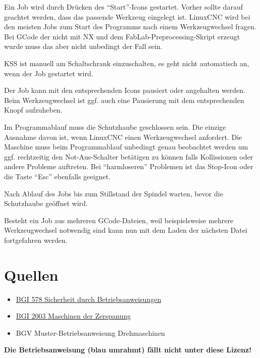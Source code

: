 \documentclass{\basedir/fablab-document}
\begin{document}
Ein Job wird durch Drücken des \enquote{Start}-Icons gestartet. Vorher sollte darauf geachtet werden,
dass das passende Werkzeug eingelegt ist. LinuxCNC wird bei den meisten Jobs zum Start des Programms nach einem Werkzeugwechsel fragen. Bei GCode der nicht mit NX und dem FabLab-Preprocessing-Skript erzeugt wurde muss das aber nicht unbedingt der Fall sein.

KSS ist manuell am Schaltschrank einzuschalten, es geht nicht automatisch an, wenn der Job gestartet wird.

Der Job kann mit den entsprechenden Icons pausiert oder angehalten werden. Beim Werkzeugwechsel ist ggf. auch eine Pausierung mit dem entsprechenden Knopf aufzuheben.

Im Programmablauf muss die Schutzhaube geschlossen sein. Die einzige Ausnahme davon ist, wenn LinuxCNC einen Werkzeugwechsel anfordert. Die Maschine muss beim Programmablauf unbedingt genau beobachtet werden um ggf. rechtzeitig den Not-Aus-Schalter betätigen zu können falls Kollissionen oder andere Probleme auftreten. Bei \enquote{harmloseren} Problemen ist das Stop-Icon oder die Taste \enquote{Esc} ebenfalls geeignet.

Nach Ablauf des Jobs bis zum Stillstand der Spindel warten, bevor die Schutzhaube geöffnet wird.

Besteht ein Job aus mehreren GCode-Dateien, weil beispielsweise mehrere Werkzeugwechsel notwendig sind kann nun mit dem Laden der nächsten Datei fortgefahren werden.

\appendix

\section{Quellen}
\begin{itemize}
 \item \href{http://publikationen.dguv.de/dguv/pdf/10002/bgi578.pdf}{BGI 578 Sicherheit durch Betriebsanweisungen}
 \item \href{http://www.arbeitssicherheit.de/media/pdfs/CCC_1290.pdf}{BGI 2003 Maschinen der Zerspanung}
 \item BGV Muster-Betriebsanweisung Drehmaschinen
\end{itemize}


\textbf{Die Betriebsanweisung (blau umrahmt) fällt nicht unter diese Lizenz!}
\end{document}
